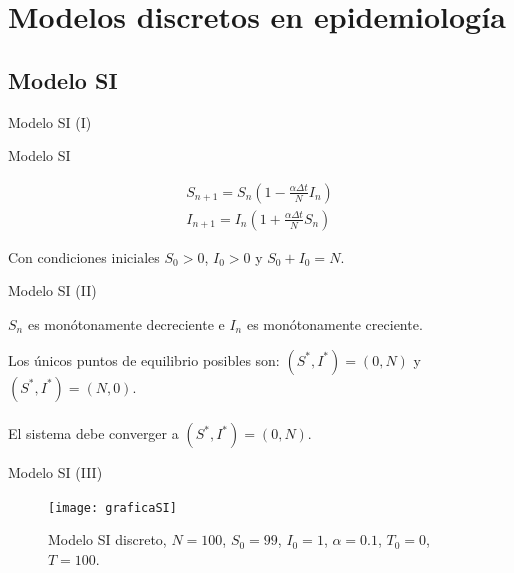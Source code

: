 

\section{Modelos discretos en epidemiología}


\subsection{Modelo SI}


\begin{frame}{Modelo SI (I)}

    \begin{block}{Modelo SI  \cite{allenDiscretetimeSISIR1994}}

        \begin{equation}
        \label{eqn: SI}
        \begin{aligned}
        S_{n+1}=S_n\left( 1-\frac{\alpha\Delta t}{N}I_n\right) \\
        I_{n+1}=I_n\left( 1+\frac{\alpha\Delta t}{N}S_n\right)
        \end{aligned}
        \end{equation}

        Con condiciones iniciales $S_0>0$, $I_0>0$ y $S_0+I_0=N$.      

    \end{block}  

\end{frame}

\begin{frame}{Modelo SI (II)}

    \begin{lema}
        $S_n$ es monótonamente decreciente e $I_n$ es monótonamente creciente.
    \end{lema}

    \pause

    Los únicos puntos de equilibrio posibles son: $(S^*,I^*)=(0,N)$ y $(S^*,I^*)=(N,0)$.
    \\~\\
    El sistema debe converger a $(S^*,I^*)=(0,N)$.

\end{frame}


\begin{frame}{Modelo SI (III)}
    \begin{figure}
        \begin{center}
        \caption{Modelo SI discreto, $N=100$, $S_0=99$, $I_0 = 1$, $\alpha = 0.1$, $T_0 = 0$, $T = 100$.}
        \texttt{[image: graficaSI]}
        \end{center}
    \end{figure}
\end{frame}


